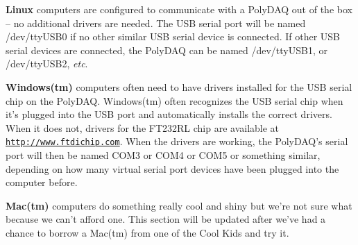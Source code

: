 \begin{DoxyItemize}
\item {\bfseries Linux} computers are configured to communicate with a Poly\-D\-A\-Q out of the box -- no additional drivers are needed. The U\-S\-B serial port will be named {\ttfamily /dev/tty\-U\-S\-B0} if no other similar U\-S\-B serial device is connected. If other U\-S\-B serial devices are connected, the Poly\-D\-A\-Q can be named {\ttfamily /dev/tty\-U\-S\-B1}, or {\ttfamily /dev/tty\-U\-S\-B2}, {\itshape etc}.
\item {\bfseries Windows(tm)} computers often need to have drivers installed for the U\-S\-B serial chip on the Poly\-D\-A\-Q. Windows(tm) often recognizes the U\-S\-B serial chip when it's plugged into the U\-S\-B port and automatically installs the correct drivers. When it does not, drivers for the F\-T232\-R\-L chip are available at {\ttfamily \href{http://www.ftdichip.com}{\tt http\-://www.\-ftdichip.\-com}}. When the drivers are working, the Poly\-D\-A\-Q's serial port will then be named {\ttfamily C\-O\-M3} or {\ttfamily C\-O\-M4} or {\ttfamily C\-O\-M5} or something similar, depending on how many virtual serial port devices have been plugged into the computer before.
\item {\bfseries Mac(tm)} computers do something really cool and shiny but we're not sure what because we can't afford one. This section will be updated after we've had a chance to borrow a Mac(tm) from one of the Cool Kids and try it.
\end{DoxyItemize}

